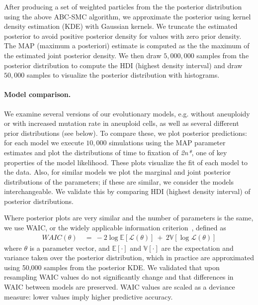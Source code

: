 \documentclass[12pt]{extarticle}
\newcommand{\likelihood}{\mathcal{L}}
\newcommand{\eumt}{\emph{2n*}}
\begin{document}
After producing a set of weighted particles from the the posterior distribution using the above ABC-SMC algorithm, we approximate the posterior using kernel density estimation (KDE) with Gaussian kernels. We truncate the estimated posterior to avoid positive posterior density for values with zero prior density. The MAP (maximum a posteriori) estimate is computed as the the maximum of the estimated joint posterior density. We then draw $5,000,000$ samples from the posterior distribution to compute the HDI (highest density interval) and draw $50,000$ samples to visualize the posterior distribution with histograms.

\paragraph{Model comparison.} 
We examine several versions of our evolutionary models, e.g. without aneuploidy or with increased mutation rate in aneuploid cells, as well as several different prior distributions (see below).
To compare these, we plot posterior predictions: for each model we execute $10,000$ simulations using the MAP parameter estimates and plot the distributions of time to fixation of \eumt, one of key properties of the model likelihood. These plots visualize the fit of each model to the data. 
Also, for similar models we plot the marginal and joint posterior distributions of the parameters; if these are similar, we consider the models interchangeable. We validate this by comparing HDI (highest density interval) of posterior distributions.

Where posterior plots are very similar and the number of parameters is the same, we use WAIC, or the widely applicable information criterion~\citep{gelman2013bayesian}, defined as
\begin{equation} \label{eq:WAIC}
\begin{aligned}
\mathit{WAIC}(\theta) &\ =\ 
-2\log\mathbb{E}[\likelihood(\theta)]\ +\ 2\mathbb{V}[\log\likelihood(\theta)]
\end{aligned}
\end{equation}
where $\theta$ is a parameter vector, and $\mathbb{E}[\cdot]$ and $\mathbb{V}[\cdot]$ are the expectation and variance taken over the posterior distribution, which in practice are approximated using 50,000 samples from the posterior KDE. We validated that upon resampling WAIC values do not significantly change and that differences in WAIC between models are preserved.
WAIC values are scaled as a deviance measure: lower values imply higher predictive accuracy.
 
\end{document}
